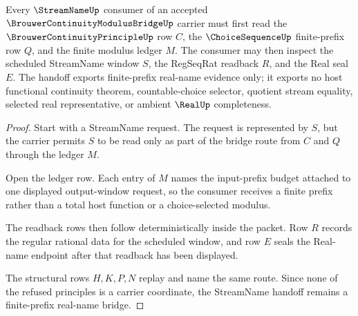 \begin{theorem}
\label{thm:brouwer-continuity-modulus-bridge-streamname-handoff}
Every $\StreamNameUp$ consumer of an accepted $\BrouwerContinuityModulusBridgeUp$ carrier must first read the $\BrouwerContinuityPrincipleUp$ row $C$, the $\ChoiceSequenceUp$ finite-prefix row $Q$, and the finite modulus ledger $M$. The consumer may then inspect the scheduled StreamName window $S$, the RegSeqRat readback $R$, and the Real seal $E$. The handoff exports finite-prefix real-name evidence only; it exports no host functional continuity theorem, countable-choice selector, quotient stream equality, selected real representative, or ambient $\RealUp$ completeness.
\end{theorem}
\begin{proof}
Start with a StreamName request. The request is represented by $S$, but the carrier permits $S$ to be read only as part of the bridge route from $C$ and $Q$ through the ledger $M$.

Open the ledger row. Each entry of $M$ names the input-prefix budget attached to one displayed output-window request, so the consumer receives a finite prefix rather than a total host function or a choice-selected modulus.

The readback rows then follow deterministically inside the packet. Row $R$ records the regular rational data for the scheduled window, and row $E$ seals the Real-name endpoint after that readback has been displayed.

The structural rows $H,K,P,N$ replay and name the same route. Since none of the refused principles is a carrier coordinate, the StreamName handoff remains a finite-prefix real-name bridge.
\end{proof}


\begin{closurestatus}{\BrouwerContinuityModulusBridgeUp}
  \theoryclosure{\seedClosure}
  \formalstatus{\unformalizedV}
\end{closurestatus}
